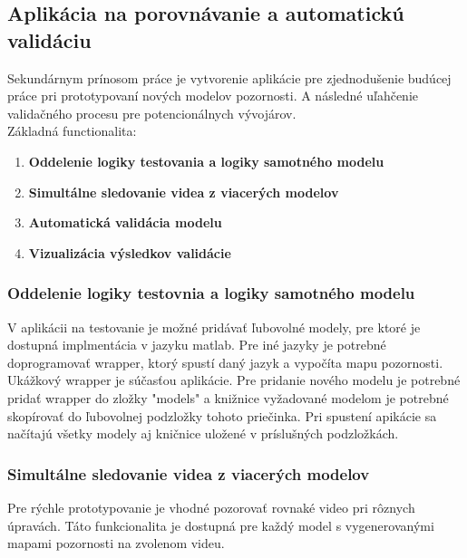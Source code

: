 \subsection{Aplikácia na porovnávanie a automatickú validáciu}
Sekundárnym prínosom práce je vytvorenie aplikácie pre zjednodušenie budúcej práce pri prototypovaní nových modelov pozornosti.
A následné uľahčenie validačného procesu pre potencionálnych vývojárov.\\
Základná functionalita:
\begin{enumerate}
  \item\textbf{Oddelenie logiky testovania a logiky samotného modelu}
  \item\textbf{Simultálne sledovanie videa z viacerých modelov}
  \item\textbf{Automatická validácia modelu}
  \item\textbf{Vizualizácia výsledkov validácie}
\end{enumerate}

\subsubsection{Oddelenie logiky testovnia a logiky samotného modelu}
V aplikácii na testovanie je možné pridávať ľubovolné modely, pre ktoré je dostupná implmentácia v jazyku matlab.
Pre iné jazyky je potrebné doprogramovať wrapper, ktorý spustí daný jazyk a vypočíta mapu pozornosti.
Ukážkový wrapper je súčasťou aplikácie.
Pre pridanie nového modelu je potrebné pridať wrapper do zložky "models" a knižnice vyžadované modelom je potrebné skopírovať do ľubovolnej podzložky tohoto priečinka.
Pri spustení apikácie sa načítajú všetky modely aj kničnice uložené v príslušných podzložkách.

\subsubsection{Simultálne sledovanie videa z viacerých modelov}
Pre rýchle prototypovanie je vhodné pozorovať rovnaké video pri rôznych úpravách.
Táto funkcionalita je dostupná pre každý model s vygenerovanými mapami pozornosti na zvolenom videu.

